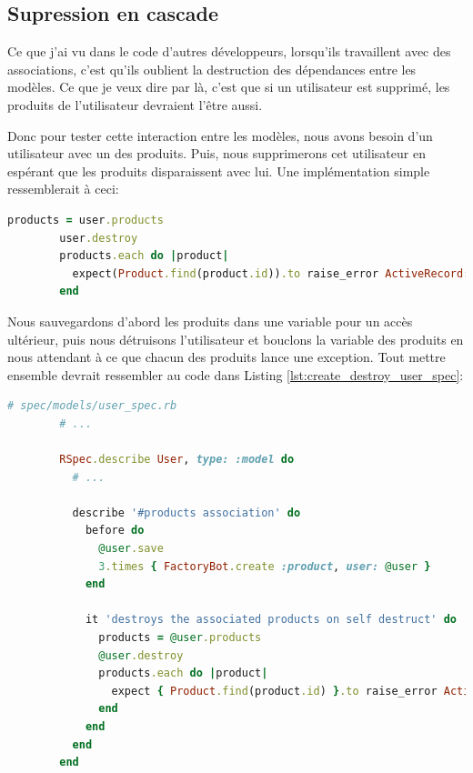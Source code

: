 \documentclass[]{report}
\begin{document}
    \subsection{Supression en cascade}

      Ce que j'ai vu dans le code d'autres développeurs, lorsqu'ils travaillent avec des associations, c'est qu'ils oublient la destruction des dépendances entre les modèles. Ce que je veux dire par là, c'est que si un utilisateur est supprimé, les produits de l'utilisateur devraient l'être aussi.

      Donc pour tester cette interaction entre les modèles, nous avons besoin d'un utilisateur avec un des produits. Puis, nous supprimerons cet utilisateur en espérant que les produits disparaissent avec lui. Une implémentation simple ressemblerait à ceci:

      \begin{scriptsize}
        \begin{lstlisting}[language=ruby]
        products = user.products
        user.destroy
        products.each do |product|
          expect(Product.find(product.id)).to raise_error ActiveRecord::RecordNotFound
        end
        \end{lstlisting}
      \end{scriptsize}

      Nous sauvegardons d'abord les produits dans une variable pour un accès ultérieur, puis nous détruisons l'utilisateur et bouclons la variable des produits en nous attendant à ce que chacun des produits lance une exception. Tout mettre ensemble devrait ressembler au code dans Listing \ref{lst:create_destroy_user_spec}:

      \begin{scriptsize}
        \begin{lstlisting}[language=ruby, caption={Test de suppression des produits liés aux utilisateurs}, label={lst:create_destroy_user_spec}]
        # spec/models/user_spec.rb
        # ...

        RSpec.describe User, type: :model do
          # ...

          describe '#products association' do
            before do
              @user.save
              3.times { FactoryBot.create :product, user: @user }
            end

            it 'destroys the associated products on self destruct' do
              products = @user.products
              @user.destroy
              products.each do |product|
                expect { Product.find(product.id) }.to raise_error ActiveRecord::RecordNotFound
              end
            end
          end
        end
        \end{lstlisting}
      \end{scriptsize}
\end{document}

